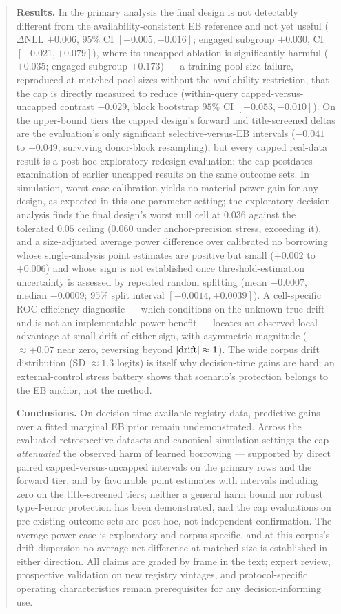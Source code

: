 \documentclass[11pt]{article}
\begin{document}
\begin{abstract}
\noindent\textbf{Results.} In the primary analysis the final design is
not detectably different from the availability-consistent EB reference
and not yet useful ($\Delta$NLL $+0.006$, $95\%$ CI
$[-0.005,+0.016]$; engaged subgroup $+0.030$, CI $[-0.021,+0.079]$),
where its uncapped ablation is significantly harmful ($+0.035$; engaged
subgroup $+0.173$) --- a training-pool-size failure, reproduced at
matched pool sizes without the availability restriction, that the cap is
directly measured to reduce (within-query capped-versus-uncapped
contrast $-0.029$, block bootstrap $95\%$ CI $[-0.053,-0.010]$). On the upper-bound tiers the capped design's
forward and title-screened deltas are the evaluation's only significant
selective-versus-EB intervals ($-0.041$ to $-0.049$, surviving
donor-block resampling), but every capped real-data result is a post hoc
exploratory redesign evaluation: the cap postdates examination of earlier
uncapped results on the same outcome sets. In simulation, worst-case
calibration yields no material power gain for any design, as expected in
this one-parameter setting; the exploratory decision analysis finds the
final design's worst null cell at $0.036$ against the tolerated $0.05$
ceiling ($0.060$ under anchor-precision stress, exceeding it), and a
size-adjusted average power difference over calibrated no borrowing whose
single-analysis point estimates are positive but small ($+0.002$ to
$+0.006$) and whose sign is not established once threshold-estimation
uncertainty is assessed by repeated random splitting (mean $-0.0007$,
median $-0.0009$; $95\%$ split interval $[-0.0014,+0.0039]$). A cell-specific ROC-efficiency
diagnostic --- which conditions on the unknown true drift and is not an
implementable power benefit --- locates an observed local advantage at
small drift of either sign, with asymmetric magnitude ($\approx +0.07$
near zero, reversing beyond $|{\rm drift}| \approx 1$). The wide corpus
drift distribution (SD $\approx 1.3$ logits) is itself why decision-time
gains are hard; an external-control stress battery shows that scenario's
protection belongs to the EB anchor, not the method.

\noindent\textbf{Conclusions.} On decision-time-available registry data,
predictive gains over a fitted marginal EB prior remain undemonstrated.
Across the evaluated retrospective datasets and canonical simulation
settings the cap \emph{attenuated} the observed harm of learned borrowing
--- supported by direct paired capped-versus-uncapped intervals on the
primary rows and the forward tier, and by favourable point estimates with
intervals including zero on the title-screened tiers;
neither a general harm bound nor robust type-I-error protection has been
demonstrated, and the cap evaluations on pre-existing outcome sets are
post hoc, not independent confirmation. The average power case is
exploratory and corpus-specific, and at this corpus's drift dispersion no
average net difference at matched size is established in either
direction. All claims are graded by frame in the text; expert review,
prospective validation on new registry vintages, and protocol-specific
operating characteristics remain prerequisites for any decision-informing
use.


\end{abstract}
\end{document}
